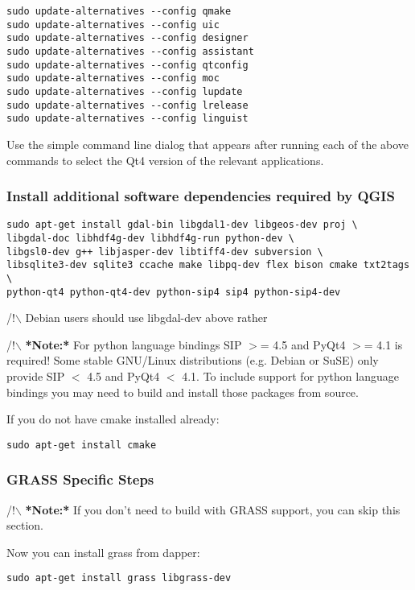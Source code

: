 \begin{verbatim}
sudo update-alternatives --config qmake
sudo update-alternatives --config uic 
sudo update-alternatives --config designer 
sudo update-alternatives --config assistant 
sudo update-alternatives --config qtconfig 
sudo update-alternatives --config moc 
sudo update-alternatives --config lupdate 
sudo update-alternatives --config lrelease 
sudo update-alternatives --config linguist 
\end{verbatim}

Use the simple command line dialog that appears after running each of the
above commands to select the Qt4 version of the relevant applications.

\subsubsection{Install additional software dependencies required by QGIS}
\begin{verbatim}
sudo apt-get install gdal-bin libgdal1-dev libgeos-dev proj \
libgdal-doc libhdf4g-dev libhdf4g-run python-dev \
libgsl0-dev g++ libjasper-dev libtiff4-dev subversion \
libsqlite3-dev sqlite3 ccache make libpq-dev flex bison cmake txt2tags \
python-qt4 python-qt4-dev python-sip4 sip4 python-sip4-dev
\end{verbatim}

/!$\backslash$ Debian users should use libgdal-dev above rather

/!$\backslash$ \textbf{*Note:*} For python language bindings SIP $>$= 4.5 and PyQt4 $>$= 4.1 is required! Some stable GNU/Linux
distributions (e.g. Debian or SuSE) only provide SIP $<$ 4.5 and PyQt4 $<$ 4.1. To include support for python 
language bindings you may need to build and install those packages from source.

If you do not have cmake installed already:

\begin{verbatim}
sudo apt-get install cmake
\end{verbatim}

\subsubsection{GRASS Specific Steps}
/!$\backslash$ \textbf{*Note:*} If you don't need to build with GRASS support,  you can
skip this section.

Now you can install grass from dapper:

\begin{verbatim}
sudo apt-get install grass libgrass-dev 
\end{verbatim}


